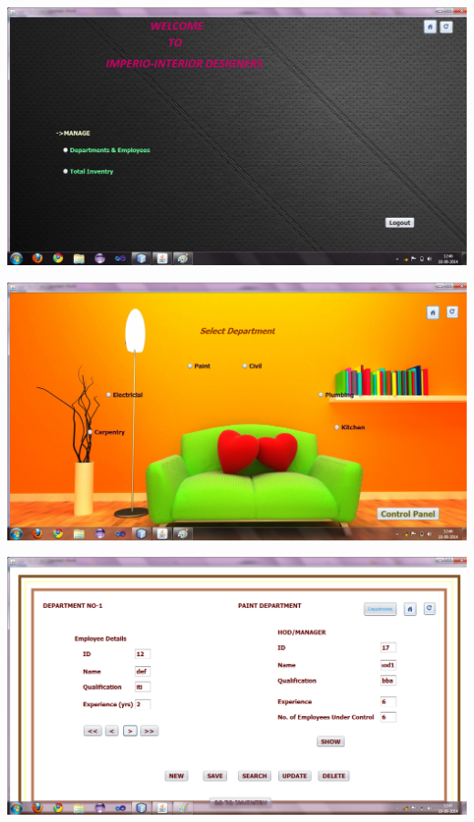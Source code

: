 \documentclass[12pt,a4paper]{report}
\begin{document}
\begin{center}
\includegraphics[scale=0.45]{12.png}
\end{center}
\begin{center}
\includegraphics[scale=0.45]{13.png}
\end{center}
\begin{center}
\includegraphics[scale=0.45]{14.png}
\end{center}
\end{document}
